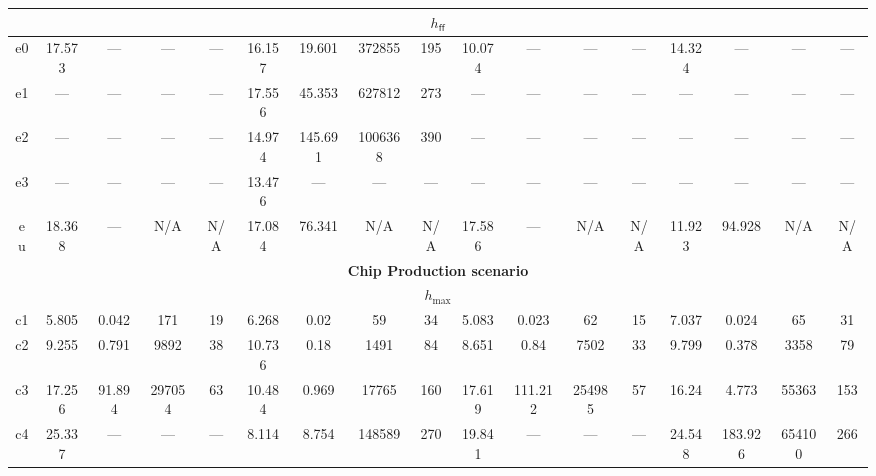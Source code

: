 \begin{tabular}{|c|c|c|c|c|c|c|c|c|c|c|c|c|c|c|c|c|}
\hline%
\multicolumn{17}{|c|}{$h_{\mathsf{ff}}$}\\%
\hline%
e0&\small{17.573}&\small{---}&\small{---}&\small{---}&\small{16.157}&\small{19.601}&\small{372855}&\small{195}&\small{10.074}&\small{---}&\small{---}&\small{---}&\small{14.324}&\small{---}&\small{---}&\small{---}\\%
\hline%
e1&\small{---}&\small{---}&\small{---}&\small{---}&\small{17.556}&\small{45.353}&\small{627812}&\small{273}&\small{---}&\small{---}&\small{---}&\small{---}&\small{---}&\small{---}&\small{---}&\small{---}\\%
\hline%
e2&\small{---}&\small{---}&\small{---}&\small{---}&\small{14.974}&\small{145.691}&\small{1006368}&\small{390}&\small{---}&\small{---}&\small{---}&\small{---}&\small{---}&\small{---}&\small{---}&\small{---}\\%
\hline%
e3&\small{---}&\small{---}&\small{---}&\small{---}&\small{13.476}&\small{---}&\small{---}&\small{---}&\small{---}&\small{---}&\small{---}&\small{---}&\small{---}&\small{---}&\small{---}&\small{---}\\%
\hline%
eu&\small{18.368}&\small{---}&\small{N/A}&\small{N/A}&\small{17.084}&\small{76.341}&\small{N/A}&\small{N/A}&\small{17.586}&\small{---}&\small{N/A}&\small{N/A}&\small{11.923}&\small{94.928}&\small{N/A}&\small{N/A}\\%
\hline%
\multicolumn{17}{c}{\textbf{Chip Production scenario}}\\%
\hline%
\multicolumn{17}{|c|}{$h_{\max}$}\\%
\hline%
c1&\small{5.805}&\small{0.042}&\small{171}&\small{19}&\small{6.268}&\small{0.02}&\small{59}&\small{34}&\small{5.083}&\small{0.023}&\small{62}&\small{15}&\small{7.037}&\small{0.024}&\small{65}&\small{31}\\%
\hline%
c2&\small{9.255}&\small{0.791}&\small{9892}&\small{38}&\small{10.736}&\small{0.18}&\small{1491}&\small{84}&\small{8.651}&\small{0.84}&\small{7502}&\small{33}&\small{9.799}&\small{0.378}&\small{3358}&\small{79}\\%
\hline%
c3&\small{17.256}&\small{91.894}&\small{297054}&\small{63}&\small{10.484}&\small{0.969}&\small{17765}&\small{160}&\small{17.619}&\small{111.212}&\small{254985}&\small{57}&\small{16.24}&\small{4.773}&\small{55363}&\small{153}\\%
\hline%
c4&\small{25.337}&\small{---}&\small{---}&\small{---}&\small{8.114}&\small{8.754}&\small{148589}&\small{270}&\small{19.841}&\small{---}&\small{---}&\small{---}&\small{24.548}&\small{183.926}&\small{654100}&\small{266}\\%

\end{tabular}
